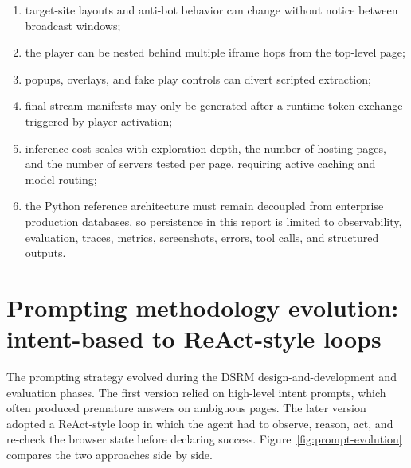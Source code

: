 \begin{enumerate}
  \item target-site layouts and anti-bot behavior can change without notice between
    broadcast windows;
  \item the player can be nested behind multiple iframe hops from the top-level page;
  \item popups, overlays, and fake play controls can divert scripted extraction;
  \item final stream manifests may only be generated after a runtime token exchange
    triggered by player activation;
  \item inference cost scales with exploration depth, the number of hosting pages, and
    the number of servers tested per page, requiring active caching and model routing;
  \item the Python reference architecture must remain decoupled from enterprise
    production databases, so persistence in this report is limited to observability,
    evaluation, traces, metrics, screenshots, errors, tool calls, and structured
    outputs.
\end{enumerate}

\section{Prompting methodology evolution: intent-based to ReAct-style loops}

The prompting strategy evolved during the DSRM design-and-development and evaluation
phases. The first version relied on high-level intent prompts, which often produced
premature answers on ambiguous pages. The later version adopted a ReAct-style loop in
which the agent had to observe, reason, act, and re-check the browser state before
declaring success. Figure~\ref{fig:prompt-evolution} compares the two approaches side by
side.

